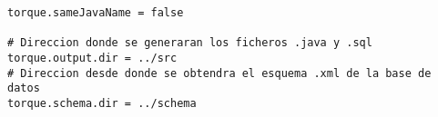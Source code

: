 \begin{lstlisting}
torque.sameJavaName = false

# Direccion donde se generaran los ficheros .java y .sql
torque.output.dir = ../src
# Direccion desde donde se obtendra el esquema .xml de la base de datos
torque.schema.dir = ../schema
\end{lstlisting}